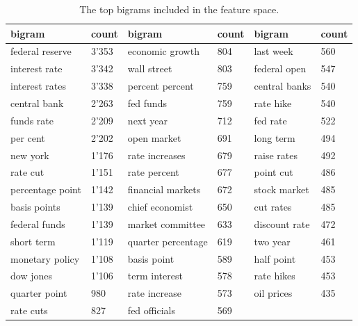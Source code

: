 \documentclass[11pt,a4paper,english,oneside]{book}
\numberwithin{equation}{chapter}
\begin{document}
\begin{table}[h] %
	\centering %
	\begin{tabular}{ p{3.4cm}  p{1cm}  p{3.4cm}  p{1cm} p{3.4cm}  p{1cm}} %
		\toprule %
		bigram & count & bigram & count & bigram & count\\
		\midrule
		federal reserve & 3'353 & economic growth & 804 & last week & 560\\
		interest rate & 3'342 & wall street & 803 & federal open & 547\\
		interest rates & 3'338 & percent percent & 759 & central banks & 540\\
		central bank & 2'263 & fed funds & 759 & rate hike & 540\\
		funds rate & 2'209 & next year & 712 & fed rate & 522\\
		per cent & 2'202 & open market & 691 & long term & 494\\
		new york & 1'176 & rate increases & 679 & raise rates & 492\\
		rate cut & 1'151 & rate percent & 677 & point cut & 486\\
		percentage point & 1'142 & financial markets & 672 & stock market & 485\\
		basis points & 1'139 & chief economist & 650 & cut rates & 485\\
		federal funds & 1'139 & market committee & 633 & discount rate & 472\\
		short term & 1'119 & quarter percentage & 619 & two year & 461\\
		monetary policy & 1'108 & basis point & 589 & half point & 453\\
		dow jones & 1'106 & term interest & 578 & rate hikes & 453\\
		quarter point & 980 & rate increase & 573 & oil prices & 435\\
		rate cuts & 827 & fed officials & 569 &  & \\
		\bottomrule %
	\end{tabular}
	\caption{The top bigrams included in the feature space.} %
	\label{tab:bigrams} %
\end{table}
\end{document}
